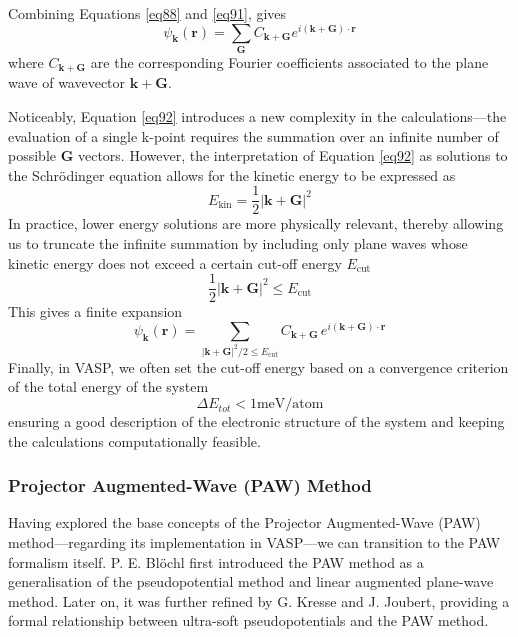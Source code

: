 \begin{itemize}
Combining Equations \ref{eq88} and \ref{eq91}, gives 
\begin{equation}
    \label{eq92}
    \psi_{\mathbf{k}}(\mathbf{r}) =
    \sum_{\mathbf{G}} C_{\mathbf{k+G}} e^{i(\mathbf{k} + \mathbf{G}) \cdot \mathbf{r}}
\end{equation}
where $C_{\mathbf{k+G}}$ are the corresponding Fourier coefficients 
associated to the plane wave of wavevector $\mathbf{k} + \mathbf{G}$.

Noticeably, Equation \ref{eq92} introduces a new complexity in the calculations---the evaluation of a single k-point requires the summation over an infinite number of possible $\mathbf{G}$ vectors. However, the interpretation of Equation \ref{eq92} as solutions to the Schrödinger equation allows for the kinetic energy to be expressed as
\begin{equation}
    \label{eq93}
    E_{\text{kin}} = \frac{1}{2} |\mathbf{k} + \mathbf{G}|^2
\end{equation}
In practice, lower energy solutions are more physically relevant, thereby allowing us to truncate the infinite summation by including only plane waves whose kinetic energy does not exceed a certain cut-off energy
$E_{\text{cut}}$
\begin{equation}
\label{eq94} 
\frac{1}{2} |\mathbf{k} + \mathbf{G}|^2 \leq E_{\text{cut}}
\end{equation}
This gives a finite expansion
\begin{equation}
    \label{eq95}
    \psi_{\mathbf{k}}(\mathbf{r}) = \sum_{|\mathbf{k} + \mathbf{G}|^2/2 \leq E_{\text{cut}}}
C_{\mathbf{k}+\mathbf{G}} \, e^{i(\mathbf{k} + \mathbf{G}) \cdot \mathbf{r}}
\end{equation}
Finally, in VASP, we often set the cut-off energy based on a convergence criterion of the total energy of the system 
\begin{equation}
\label{eq96}
    \Delta E_{tot} < 1 \text{meV/atom}
\end{equation}
ensuring a good description of the electronic structure of the system and keeping the calculations computationally feasible.

\end{itemize}

\subsubsection{Projector Augmented-Wave (PAW) Method}
Having explored the base concepts of the Projector Augmented-Wave (PAW) method---regarding its implementation in VASP---we can transition to the PAW formalism itself.  P. E. Bl\"ochl\supercite{Blochl1994} first introduced the PAW method  as a generalisation of the pseudopotential method and linear augmented plane-wave method. Later on, it was further refined by G. Kresse and J. Joubert\supercite{Kresse1999}, providing a formal relationship between ultra-soft pseudopotentials and the PAW method. 

